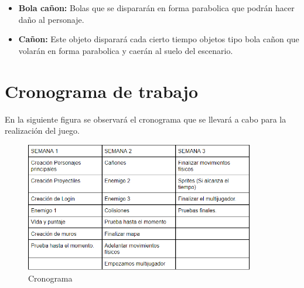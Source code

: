 \documentclass{article}
\begin{document}
\begin{itemize}
    \item {\textbf{Bola cañon:}} Bolas que se dispararán en forma parabolica que podrán hacer daño al personaje. 
\end{itemize}
\begin{itemize}
    \item {\textbf{Cañon:}} Este objeto disparará cada cierto tiempo objetos tipo bola cañon que volarán en forma parabolica y caerán al suelo del escenario.
\end{itemize}
\newpage

\section{Cronograma de trabajo}
En la siguiente figura se observará el cronograma que se llevará a cabo para la realización del juego.
\begin{figure}[ht]
\includegraphics[width=10cm]{Cronograma.png}
\centering
\caption{Cronograma}
\label{fig:juego}
\end{figure}
\end{document}

